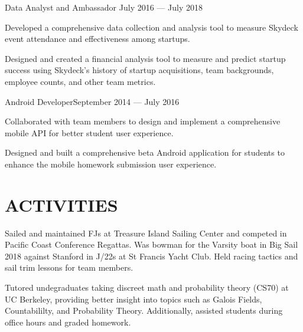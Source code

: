 \documentclass[10pt]{article}
\begin{document}
	   		
	   			{Data Analyst and Ambassador}
	   			{July 2016 --- July 2018}
			  		\begin{accomplishments}
	                   		\item Developed a comprehensive data collection and analysis tool to measure Skydeck event attendance and effectiveness among startups.
	                   		\item Designed and created a financial analysis tool to measure and predict startup success using Skydeck's history of startup acquisitions, team backgrounds, employee counts, and other team metrics.
	                  \end{accomplishments}
                  	 
                  	 
                {Android Developer}{September 2014 --- July 2016}
                 			\begin{accomplishments}					        
                   			\item Collaborated with team members to design and implement a comprehensive mobile API for better student user experience.
                   			\item Designed and built a comprehensive beta Android application for students to enhance the mobile homework submission user experience.
                  		 \end{accomplishments}
                  		 
                  
\section*{ACTIVITIES}
        {Sailed and maintained FJs at Treasure Island Sailing Center and competed in Pacific Coast Conference Regattas. Was bowman for the Varsity boat in Big Sail 2018 against Stanford in J/22s at St Francis Yacht Club. Held racing tactics and sail trim lessons for team members.}

				{Tutored undegraduates taking discreet math and probability theory (CS70) at UC Berkeley, providing 	better insight into topics such as Galois Fields, Countabililty, and Probability Theory. Additionally, assisted students during office hours and graded homework.}

                
\end{document}

